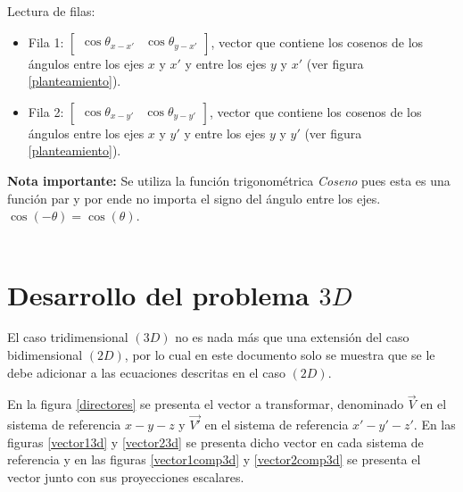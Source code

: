 \documentclass[12pt,letterpaper, twoside, openany]{article}
\begin{document}
%
Lectura de filas:
%
\begin{itemize}
	\item Fila 1: $ \left[ \begin{array}{cc}
		\cos \theta_{x-x'} &	 \cos \theta_{y-x'}
	\end{array} \right]$, vector que contiene los cosenos de los ángulos entre los ejes $x$ y $x'$ y entre los ejes $y$ y $x'$ (ver figura \ref{planteamiento}).
	\item Fila 2: $ \left[ \begin{array}{cc}
		\cos \theta_{x-y'} &	 \cos \theta_{y-y'}
	\end{array} \right]$, vector que contiene los cosenos de los ángulos entre los ejes $x$ y $y'$ y entre los ejes $y$ y $y'$ (ver figura \ref{planteamiento}).
\end{itemize}
%
{\bf Nota importante: } Se utiliza la función trigonométrica {\it{Coseno}} pues esta es una función par y por ende no importa el signo del ángulo entre los ejes.\\
$\cos \left( -\theta \right) = \cos \left( \theta \right)$.\\\\


\section{Desarrollo del problema $3D$}
%
El caso tridimensional $(3D)$ no es nada más que una extensión del caso bidimensional $(2D)$, por lo cual en este documento solo se muestra que se le debe adicionar a las ecuaciones descritas en el caso $(2D)$. 

En la figura \ref{directores} se presenta el vector a transformar, denominado $\overset{\rightarrow}{V}$ en el sistema de referencia $x-y-z$ y $\overset{\rightarrow}{V'}$ en el sistema de referencia $x'-y'-z'$. En las figuras \ref{vector13d} y \ref{vector23d} se presenta dicho vector en cada sistema de referencia y en las figuras \ref{vector1comp3d} y \ref{vector2comp3d} se presenta el vector junto con sus proyecciones escalares.\\\\
\end{document}
